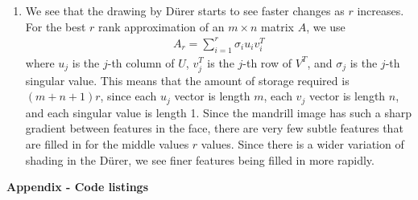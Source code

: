 \documentclass[12pt]{article}
\begin{document}
\begin{enumerate}[leftmargin=0.6cm,label=(\alph*)]
\begin{figure}[H]
\begin{center}
		\end{center}
	\end{figure}
	\item We see that the drawing by D\"urer starts to see faster changes as $ r $ increases. For the best $ r $ rank approximation of an $ m \times n $ matrix $ A $, we use
	\begin{align*}
	A_r = \sum_{i=1}^r \sigma_iu_iv_i^T
	\end{align*}
	where $ u_j $ is the $ j $-th column of $ U $, $ v_j^T $ is the $ j $-th row of $ V^T $, and $ \sigma_j $ is the $ j $-th singular value. This means that the amount of storage required is $ (m+n+1)r $, since each $ u_j $ vector is length $ m $, each $ v_j $ vector is length $ n $, and each singular value is length 1. Since the mandrill image has such a sharp gradient between features in the face, there are very few subtle features that are filled in for the middle values $ r $ values. Since there is a wider variation of shading in the D\"urer, we see finer features being filled in more rapidly. 
\end{enumerate}

{\hspace{-4 ex} \large \textbf{Appendix - Code listings}}\bigbreak
\end{document}
